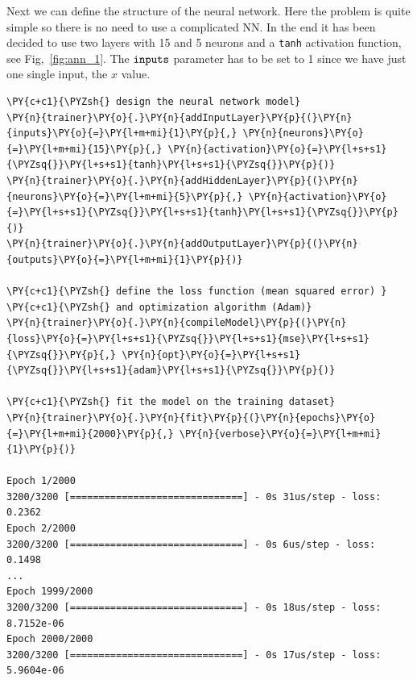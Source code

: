 Next we can define the structure of the neural network. Here the problem is quite simple so there is no need to use a complicated NN.
In the end it has been decided to use two layers with 15 and 5 neurons and a
\texttt{tanh} activation function, see Fig,~\ref{fig:ann_1}. The \(\tt{inputs}\) parameter has to be
set to 1 since we have just one single input, the \(x\) value.

\begin{codebox}[breakable, size=fbox, boxrule=1pt, pad at break*=1mm,colback=cellbackground, colframe=cellborder]
\begin{Verbatim}[commandchars=\\\{\}]
\PY{c+c1}{\PYZsh{} design the neural network model}
\PY{n}{trainer}\PY{o}{.}\PY{n}{addInputLayer}\PY{p}{(}\PY{n}{inputs}\PY{o}{=}\PY{l+m+mi}{1}\PY{p}{,} \PY{n}{neurons}\PY{o}{=}\PY{l+m+mi}{15}\PY{p}{,} \PY{n}{activation}\PY{o}{=}\PY{l+s+s1}{\PYZsq{}}\PY{l+s+s1}{tanh}\PY{l+s+s1}{\PYZsq{}}\PY{p}{)}
\PY{n}{trainer}\PY{o}{.}\PY{n}{addHiddenLayer}\PY{p}{(}\PY{n}{neurons}\PY{o}{=}\PY{l+m+mi}{5}\PY{p}{,} \PY{n}{activation}\PY{o}{=}\PY{l+s+s1}{\PYZsq{}}\PY{l+s+s1}{tanh}\PY{l+s+s1}{\PYZsq{}}\PY{p}{)}
\PY{n}{trainer}\PY{o}{.}\PY{n}{addOutputLayer}\PY{p}{(}\PY{n}{outputs}\PY{o}{=}\PY{l+m+mi}{1}\PY{p}{)}
	
\PY{c+c1}{\PYZsh{} define the loss function (mean squared error) }
\PY{c+c1}{\PYZsh{} and optimization algorithm (Adam)}
\PY{n}{trainer}\PY{o}{.}\PY{n}{compileModel}\PY{p}{(}\PY{n}{loss}\PY{o}{=}\PY{l+s+s1}{\PYZsq{}}\PY{l+s+s1}{mse}\PY{l+s+s1}{\PYZsq{}}\PY{p}{,} \PY{n}{opt}\PY{o}{=}\PY{l+s+s1}{\PYZsq{}}\PY{l+s+s1}{adam}\PY{l+s+s1}{\PYZsq{}}\PY{p}{)}
	
\PY{c+c1}{\PYZsh{} fit the model on the training dataset}
\PY{n}{trainer}\PY{o}{.}\PY{n}{fit}\PY{p}{(}\PY{n}{epochs}\PY{o}{=}\PY{l+m+mi}{2000}\PY{p}{,} \PY{n}{verbose}\PY{o}{=}\PY{l+m+mi}{1}\PY{p}{)}
	
Epoch 1/2000
3200/3200 [==============================] - 0s 31us/step - loss: 0.2362
Epoch 2/2000
3200/3200 [==============================] - 0s 6us/step - loss: 0.1498
...
Epoch 1999/2000
3200/3200 [==============================] - 0s 18us/step - loss: 8.7152e-06
Epoch 2000/2000
3200/3200 [==============================] - 0s 17us/step - loss: 5.9604e-06
\end{Verbatim}
\end{codebox}

